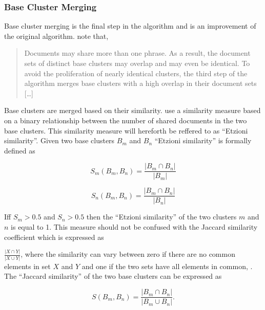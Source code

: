 \subsubsection{Base Cluster Merging}
Base cluster merging is the final step in the \STC algorithm and is an improvement of the original algorithm. \citeauthor{Oren1998} note that,
\begin{quote}
Documents may share more than one phrase. As a result, the document sets of distinct base clusters may overlap and may even be identical. To avoid the proliferation of nearly identical clusters, the third step of the algorithm merges base clusters with a high overlap in their document sets [\dots] \cite[][3]{Oren1998}
\end{quote}

Base clusters are merged based on their similarity. \citeauthor{Oren1998} use a similarity measure based on a binary relationship between the number of shared documents in the two base clusters. This similarity measure will hereforth be reffered to as ``Etzioni similarity''. Given two base clusters \(B_m\) and \(B_n\) ``Etzioni similarity'' is formally defined as 

\begin{displaymath} 
S_{m}(B_{m},B_{n}) = 
\frac{\vert B_{m} \cap B_{n} \vert} {\vert B_{m} \vert}
\end{displaymath}

\begin{displaymath} 
S_{n}(B_{m},B_{n}) = 
\frac{\vert B_{m} \cap B_{n} \vert} {\vert B_{n} \vert}
\end{displaymath}

Iff \(S_{m} > 0.5\) and \(S_{n} > 0.5 \) then the ``Etzioni similarity'' of the two clusters \(m\) and \(n\) is equal to 1. This measure should not be confused with the Jaccard similarity coefficient which is expressed as 

\begin{math}
\frac{\vert X \cap Y \vert} {\vert X \cup Y \vert}
\end{math}, where the similarity can vary between zero if there are no common elements in set \(X\) and \(Y\) and one if the two sets have all elements in common, \cite{VanRijsbergen1979}. The ``Jaccard similarity'' of the two base clusters can be expressed as

\begin{displaymath} 
S(B_{m}, B_{n}) = 
\frac{\vert B_{m} \cap B_{n} \vert} {\vert B_{m} \cup B_{n} \vert}.
\end{displaymath}

